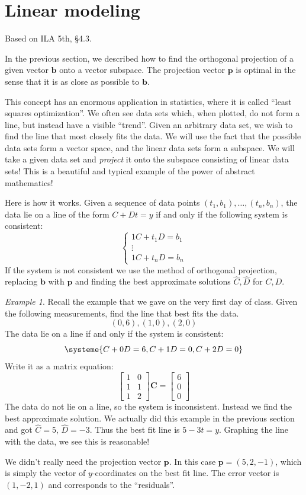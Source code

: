 \documentclass[11pt,oneside]{amsbook}
\theoremstyle{definition}
\theoremstyle{plain}
\theoremstyle{definition}
\theoremstyle{remark}
\newtheorem{example}[theorem]{Example}
\numberwithin{equation}{section}
\numberwithin{figure}{section}
\begin{document}
\newpage
\section{Linear modeling}

Based on ILA 5th, \S 4.3.

In the previous section, we described how to find the orthogonal projection of a given vector $\mathbf{b}$ onto a vector subspace. The projection vector $\mathbf{p}$ is optimal in the sense that it is as close as possible to $\mathbf{b}$.

This concept has an enormous application in statistics, where it is called ``least squares optimization''. We often see data sets which, when plotted, do not form a line, but instead have a visible ``trend''. Given an arbitrary data set, we wish to find the line that most closely fits the data. We will use the fact that the possible data sets form a vector space, and the linear data sets form a subspace. We will take a given data set and \emph{project} it onto the subspace consisting of linear data sets! This is a beautiful and typical example of the power of abstract mathematics!

Here is how it works. Given a sequence of data points $(t_1,b_1),\ldots,(t_n,b_n)$, the data lie on a line of the form $C+Dt=y$ if and only if the following system is consistent:
\[\begin{cases}1C+t_1 D=b_1\\\vdots\\1C+t_nD=b_n\end{cases}
\]
If the system is not consistent we use the method of orthogonal projection, replacing $\mathbf{b}$ with $\mathbf{p}$ and finding the best approximate solutions $\hat C,\hat D$ for $C,D$.

\begin{example}
  Recall the example that we gave on the very first day of class. Given the following measurements, find the line that best fits the data.
  \[(0,6),(1,0),(2,0)
  \]
  The data lie on a line if and only if the system is consistent:
  \[\systeme{C+0D=6,C+1D=0,C+2D=0}
  \]
  Write it as a matrix equation:
  \[\begin{bmatrix}1&0\\1&1\\1&2\end{bmatrix}
    \mathbf{C}=\begin{bmatrix}6\\0\\0\end{bmatrix}
  \]
  The data do not lie on a line, so the system is inconsistent. Instead we find the best approximate solution. We actually did this example in the previous section and got $\hat C=5$, $\hat D=-3$. Thus the best fit line is $5-3t=y$. Graphing the line with the data, we see this is reasonable!

  We didn't really need the projection vector $\mathbf{p}$. In this case $\mathbf{p}=(5,2,-1)$, which is simply the vector of $y$-coordinates on the best fit line. The error vector is $(1,-2,1)$ and corresponds to the ``residuals''.
\end{example}
\end{document}
